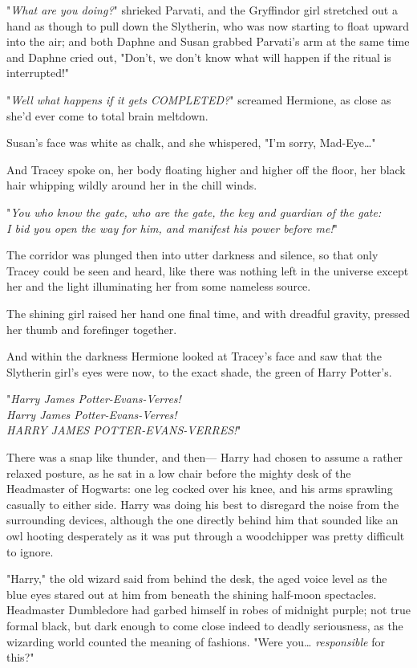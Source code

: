 "\emph{What are you doing?}" shrieked Parvati, and the Gryffindor girl
stretched out a hand as though to pull down the Slytherin, who was now starting
to float upward into the air; and both Daphne and Susan grabbed Parvati's arm
at the same time and Daphne cried out, "Don't, we don't know what will happen
if the ritual is interrupted!"

"\emph{Well what happens if it gets COMPLETED?}" screamed Hermione, as close as
she'd ever come to total brain meltdown.

Susan's face was white as chalk, and she whispered, "I'm sorry, Mad-Eye{\ldots}"

And Tracey spoke on, her body floating higher and higher off the floor, her
black hair whipping wildly around her in the chill winds.

"\emph{You who know the gate, who are the gate, the key and guardian of the
gate:\\
I bid you open the way for him, and manifest his power before me!}"

The corridor was plunged then into utter darkness and silence, so that only
Tracey could be seen and heard, like there was nothing left in the universe
except her and the light illuminating her from some nameless source.

The shining girl raised her hand one final time, and with dreadful gravity,
pressed her thumb and forefinger together.

And within the darkness Hermione looked at Tracey's face and saw that the
Slytherin girl's eyes were now, to the exact shade, the green of Harry Potter's.

"\emph{Harry James Potter-Evans-Verres!\\
Harry James Potter-Evans-Verres!\\
HARRY JAMES POTTER-EVANS-VERRES!}"

There was a snap like thunder, and then---
\later
Harry had chosen to assume a rather relaxed posture, as he sat in a low chair
before the mighty desk of the Headmaster of Hogwarts: one leg cocked over his
knee, and his arms sprawling casually to either side. Harry was doing his best
to disregard the noise from the surrounding devices, although the one directly
behind him that sounded like an owl hooting desperately as it was put through a
woodchipper was pretty difficult to ignore.

"Harry," the old wizard said from behind the desk, the aged voice level as the
blue eyes stared out at him from beneath the shining half-moon spectacles.
Headmaster Dumbledore had garbed himself in robes of midnight purple; not true
formal black, but dark enough to come close indeed to deadly seriousness, as
the wizarding world counted the meaning of fashions. "Were you{\ldots}
\emph{responsible} for this?"

